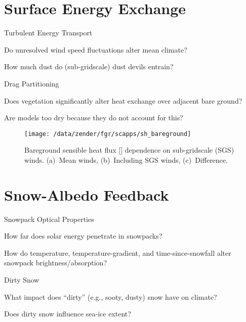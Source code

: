\documentclass[12pt]{article}
\begin{document}
\section[Surface Energy Exchange]{Surface Energy Exchange}
\Large
\begin{enumerate*}
\item Turbulent Energy Transport
\begin{enumerate*}
\item Do unresolved wind speed fluctuations alter mean climate?
\item How much dust do (sub-gridscale) dust devils entrain?
\end{enumerate*}
\item Drag Partitioning
\begin{enumerate*}
\item Does vegetation significantly alter heat exchange over adjacent bare ground?
\item Are models too dry because they do not account for this?
\end{enumerate*}
\end{enumerate*}
\clearpage

\Large
\begin{figure}
\centering
\texttt{[image: /data/zender/fgr/scapps/sh\_bareground]}
\caption{
Bareground sensible heat flux [\wxmS] dependence on sub-gridscale (SGS) winds.
(a)~Mean winds, (b)~Including SGS winds, (c)~Difference.
\label{fgr:shflx}}
\end{figure}
\clearpage

\section[Snow-Albedo Feedback]{Snow-Albedo Feedback}
\Large
\begin{enumerate*}
\item Snowpack Optical Properties
\begin{enumerate*}
\item How far does solar energy penetrate in snowpacks?
\item How do temperature, temperature-gradient, and
  time-since-snowfall alter snowpack brightness/absorption?
\end{enumerate*}
\item Dirty Snow
\begin{enumerate*}
\item What impact does ``dirty'' (e.g., sooty, dusty) snow have on climate?
\item Does dirty snow influence sea-ice extent?
\end{enumerate*}
\end{enumerate*}
\clearpage
\end{document}
